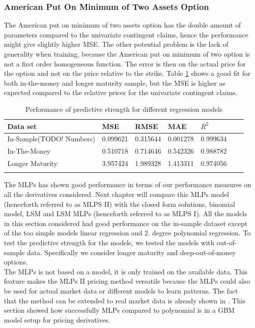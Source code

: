 \subsubsection{American Put On Minimum of Two Assets Option}
The American put on minimum of two assets option has the double amount of parameters compared to the univariate contingent claims, hence the performance might give slightly higher MSE. The other potential problem is the lack of generality when training, because the American put on minimum of two option is not a first order homogeneous function. The error is then on the actual price for the option and not on the price relative to the strike. Table \ref{tab:AmerMinPerformanceComparision} shows a good fit for both in-the-money and longer maturity sample, but the MSE is higher as expected compared to the relative prices for the univariate contingent claims.  

\begin{table}[th]
\caption{Performance of predictive strength for different regression models}
\label{tab:AmerMinPerformanceComparision}
\centering
\begin{tabular}{l l l l l l l }
\toprule
\textbf{Data set} & \textbf{MSE} & \textbf{RMSE} & \textbf{MAE} & \textbf{$R^2$} \\
\midrule
In-Sample(TODO! Numbers) & 0.099621 & 0.315644 & 0.001278 & 0.999634\\
In-The-Money & 0.510718 & 0.714646 & 0.542326 & 0.988782\\
Longer Maturity & 3.957424 & 1.989328 & 1.413311 & 0.974056\\
\bottomrule\\
\end{tabular}
\end{table}

The MLPs has shown good performance in terms of our performance measures on all the derivatives considered. Next chapter will compare this MLPs model (henceforth referred to as MLPS II) with the closed form solutions, binomial model, LSM and LSM MLPs (henceforth referred to as MLPS I). All the models in this section considered had good performance on the in-sample dataset except of the too simple models linear regression and 2. degree polynomial regression. To test the predictive strength for the models, we tested the models with out-of-sample data. Specifically we consider longer maturity and deep-out-of-money options.\\

The MLPs is not based on a model, it is only trained on the available data. This feature makes the MLPs II pricing method versatile because the MLPs could also be used for actual market data or different models to learn patterns. The fact that the method can be extended to real market data is already shown in \parencite{GasparRaquel20}. This section showed how successfully MLPs compared to polynomial is in a GBM model setup for pricing derivatives.









